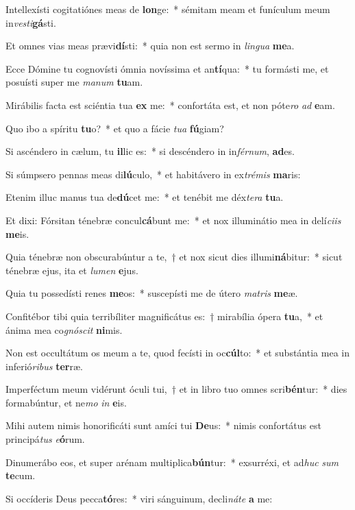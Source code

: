 \item Intellexísti cogitatiónes meas de \textbf{lon}ge:~* sémitam meam et funículum meum in\textit{vesti}\textbf{gá}sti.
\item Et omnes vias meas prævi\textbf{dí}sti:~* quia non est sermo in \textit{lingua} \textbf{me}a.
\item Ecce Dómine tu cognovísti ómnia novíssima  et an\textbf{tí}qua:~* tu formásti me, et posuísti super me \textit{manum} \textbf{tu}am.
\item Mirábilis facta est sciéntia tua \textbf{ex} me:~* confortáta est, et non póte\textit{ro} \textit{ad} \textbf{e}am.
\item Quo ibo a spíritu \textbf{tu}o?~* et quo a fácie \textit{tua} \textbf{fú}giam?
\item Si ascéndero in cælum, tu \textbf{il}lic es:~* si descéndero in in\textit{férnum}, \textbf{ad}es.
\item Si súmpsero pennas meas di\textbf{lú}culo,~* et habitávero in ex\textit{trémis} \textbf{ma}ris:
\item Etenim illuc manus tua de\textbf{dú}cet me:~* et tenébit me déx\textit{tera} \textbf{tu}a.
\item Et dixi: Fórsitan ténebræ concul\textbf{cá}bunt me:~* et nox illuminátio mea in delí\textit{ciis} \textbf{me}is.
\item Quia ténebræ non obscurabúntur a te,~† et nox sicut dies illumi\textbf{ná}bitur:~* sicut ténebræ ejus, ita et \textit{lumen} \textbf{e}jus.
\item Quia tu possedísti renes \textbf{me}os:~* suscepísti me de útero \textit{matris} \textbf{me}æ.
\item Confitébor tibi quia terribíliter magnificátus es:~† mirabília ópera \textbf{tu}a,~* et ánima mea co\textit{gnóscit} \textbf{ni}mis.
\item Non est occultátum os meum a te, quod fecísti in oc\textbf{cúl}to:~* et substántia mea in inferió\textit{ribus} \textbf{ter}ræ.
\item Imperféctum meum vidérunt óculi tui,~† et in libro tuo o\-mnes scri\textbf{bén}tur:~* dies formabúntur, et ne\textit{mo} \textit{in} \textbf{e}is.
\item Mihi autem nimis honorificáti sunt amíci tui \textbf{De}us:~* nimis confortátus est principá\textit{tus} \textit{e}\textbf{ó}rum.
\item Dinumerábo eos, et super arénam multiplica\textbf{bún}tur:~* exsurréxi, et ad\textit{huc} \textit{sum} \textbf{te}cum.
\item Si occíderis Deus pecca\textbf{tó}res:~* viri sánguinum, decli\textit{náte} \textbf{a} me:

